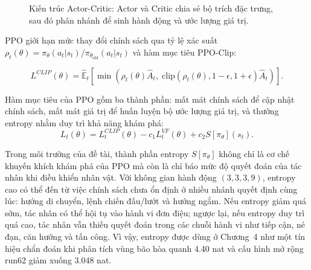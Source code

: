 \begin{figure}[H]
\centering
{}
\caption{Kiến trúc Actor-Critic: Actor và Critic chia sẻ bộ trích đặc trưng, sau đó phân nhánh để sinh hành động và ước lượng giá trị.}
\label{fig:actor_critic}
\end{figure}

PPO giới hạn mức thay đổi chính sách qua tỷ lệ xác suất $\rho_t(\theta) = \pi_\theta(a_t|s_t) / \pi_{\theta_\text{old}}(a_t|s_t)$ và hàm mục tiêu PPO-Clip:

\begin{equation} \label{eq:ppo_clip}
    L^{CLIP}(\theta) =
    \hat{\mathbb{E}}_t
    \left[
    \min
    \left(
    \rho_t(\theta)\hat{A}_t,\;
    \mathrm{clip}(\rho_t(\theta),1-\epsilon,1+\epsilon)\hat{A}_t
    \right)
    \right].
\end{equation}

Hàm mục tiêu của PPO gồm ba thành phần: mất mát chính sách để cập nhật chính sách, mất mát giá trị để huấn luyện bộ ước lượng giá trị, và thưởng entropy nhằm duy trì khả năng khám phá:
\begin{equation} \label{eq:ppo_total}
    L_t(\theta) = L_t^{CLIP}(\theta) - c_1 L_t^{VF}(\theta) + c_2 S[\pi_\theta](s_t).
\end{equation}

Trong môi trường của đề tài, thành phần entropy $S[\pi_\theta]$ không chỉ là cơ chế khuyến khích khám phá của PPO mà còn là chỉ báo mức độ quyết đoán của tác nhân khi điều khiển nhân vật. Với không gian hành động $(3,3,3,9)$, entropy cao có thể đến từ việc chính sách chưa ổn định ở nhiều nhánh quyết định cùng lúc: hướng di chuyển, lệnh chiến đấu/lướt và hướng ngắm. Nếu entropy giảm quá sớm, tác nhân có thể hội tụ vào hành vi đơn điệu; ngược lại, nếu entropy duy trì quá cao, tác nhân vẫn thiếu quyết đoán trong các chuỗi hành vi như tiếp cận, né đạn, căn hướng và tấn công. Vì vậy, entropy được dùng ở Chương~4 như một tín hiệu chẩn đoán khi phân tích vùng bão hòa quanh 4.40 nat và cấu hình mở rộng run62 giảm xuống 3.048 nat.

